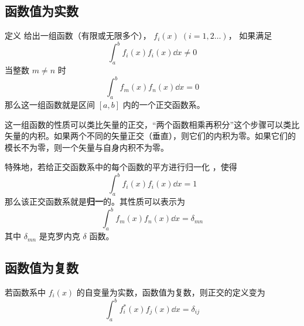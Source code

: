 
\subsection{函数值为实数}

定义
给出一组函数（有限或无限多个）， $f_i(x)\; (i = 1,2\dots)$， 如果满足
\begin{equation}
\int_a^b f_i(x) f_i(x) \dd{x} \ne 0
\end{equation} 
当整数 $m \ne n$ 时
\begin{equation}
\int_a^b f_m(x) f_n(x) \dd{x} = 0
\end{equation} 
那么这一组函数就是区间 $[a,b]$ 内的一个正交函数系。

这一组函数的性质可以类比矢量的正交，“两个函数相乘再积分”这个步骤可以类比矢量的内积。如果两个不同的矢量正交（垂直），则它们的内积为零。如果它们的模长不为零，则一个矢量与自身内积不为零。

特殊地，若给正交函数系中的每个函数的平方进行归一化%
，使得
\begin{equation}
\int_a^b f_i(x) f_i(x) \dd{x} = 1
\end{equation} 
那么该正交函数系就是\textbf{归一}的。其性质可以表示为
 \begin{equation}
\int_a^b f_m(x) f_n(x) \dd{x} = \delta_{mn}
\end{equation} 
其中 $\delta_{mn}$ 是克罗内克 $\delta$ 函数。


\subsection{函数值为复数}

若函数系中 $f_i(x)$ 的自变量为实数，函数值为复数，则正交的定义变为
 \begin{equation}
\int_a^b f_i^*(x) f_j(x) \dd{x} = \delta_{ij}
\end{equation}
